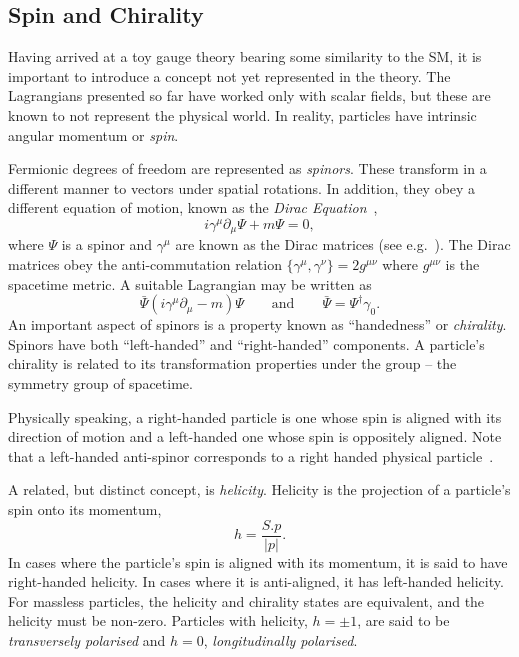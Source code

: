 \subsection{Spin and Chirality}
Having arrived at a toy gauge theory bearing some similarity to the \ac{SM}, it
is important to introduce a concept not yet represented in the theory. The
Lagrangians presented so far have worked only with scalar fields, but these are
known to not represent the physical world. In reality, particles have intrinsic
angular momentum or \emph{spin}.

Fermionic degrees of freedom are represented as \emph{spinors}. These transform
in a different manner to vectors under spatial rotations. In addition, they obey
a different equation of motion, known as the \emph{Dirac
  Equation}~\cite{peskin_schroeder},
\begin{equation*}
i\gamma^\mu \partial_{\mu}\Psi + m\Psi = 0,
\end{equation*}
where $\Psi$ is a spinor and $\gamma^{\mu}$ are known as the Dirac matrices (see
e.g.~\cite{aitchison}). The Dirac matrices obey the anti-commutation relation
$\{\gamma^{\mu}, \gamma^{\nu}\} = 2g^{\mu\nu}$ where $g^{\mu\nu}$ is the
spacetime metric. A suitable Lagrangian may be written as
\begin{equation*}
\bar{\Psi} \left (i\gamma^{\mu}\partial_{\mu} -m\right)\Psi \qquad \textrm{and} \qquad \bar{\Psi} =
\Psi^{\dagger}\gamma_0.
\end{equation*}
An important aspect of spinors is a property known as ``handedness'' or
\emph{chirality}. Spinors have both ``left-handed'' and ``right-handed''
components. A particle's chirality is related to its transformation properties
under the \Poincare group -- the symmetry group of spacetime.

Physically speaking, a right-handed particle is one whose spin
is aligned with its direction of motion and a left-handed one whose spin is
oppositely aligned. Note that a left-handed anti-spinor corresponds to a right
handed physical particle~\cite{peskin_schroeder}.

A related, but distinct concept, is \emph{helicity}. Helicity is the projection
of a particle's spin onto its momentum,
\begin{equation*}
h = \frac{S.p}{\left|p\right|}.
\end{equation*}
In cases where the particle's spin is aligned with its momentum, it is said to
have right-handed helicity. In cases where it is anti-aligned, it has
left-handed helicity. For massless particles, the helicity and chirality states
are equivalent, and the helicity must be non-zero. Particles with helicity,
$h=\pm 1$, are said to be \emph{transversely polarised} and $h=0$,
\emph{longitudinally polarised}.


